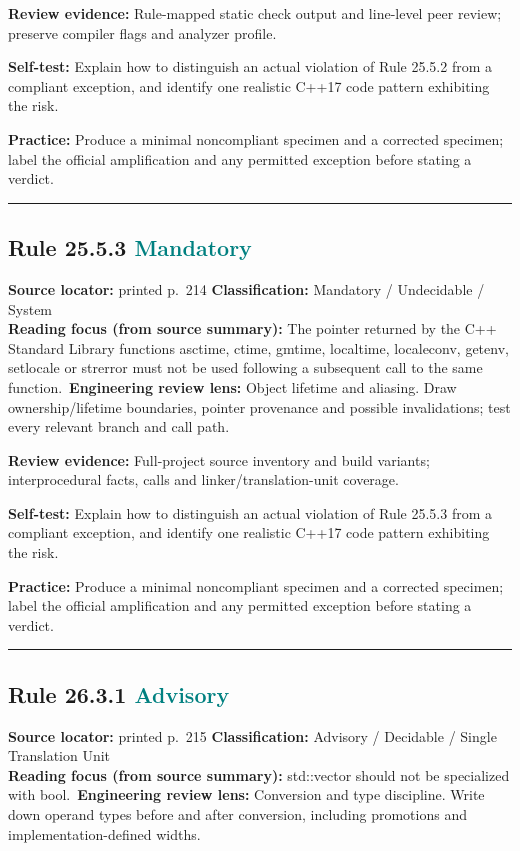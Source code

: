 \documentclass[10pt,letterpaper]{article}
\begin{document}
\textbf{Review evidence:} Rule-mapped static check output and line-level peer review; preserve compiler flags and analyzer profile.

\textbf{Self-test:} Explain how to distinguish an actual violation of Rule 25.5.2 from a compliant exception, and identify one realistic C++17 code pattern exhibiting the risk.\par
\textbf{Practice:} Produce a minimal noncompliant specimen and a corrected specimen; label the official amplification and any permitted exception before stating a verdict.
\smallskip\hrule\smallskip
\subsection*{Rule 25.5.3 \enspace \texorpdfstring{\small\textcolor{teal}{Mandatory}}{Mandatory}}
\noindent\textbf{Source locator:} printed p.~214 \quad\textbf{Classification:} Mandatory / Undecidable / System\\
\textbf{Reading focus (from source summary):} The pointer returned by the C++ Standard Library functions asctime, ctime, gmtime, localtime, localeconv, getenv, setlocale or strerror must not be used following a subsequent call to the same function.\
\textbf{Engineering review lens:} Object lifetime and aliasing. Draw ownership/lifetime boundaries, pointer provenance and possible invalidations; test every relevant branch and call path.

\textbf{Review evidence:} Full-project source inventory and build variants; interprocedural facts, calls and linker/translation-unit coverage.

\textbf{Self-test:} Explain how to distinguish an actual violation of Rule 25.5.3 from a compliant exception, and identify one realistic C++17 code pattern exhibiting the risk.\par
\textbf{Practice:} Produce a minimal noncompliant specimen and a corrected specimen; label the official amplification and any permitted exception before stating a verdict.
\smallskip\hrule\smallskip
\subsection*{Rule 26.3.1 \enspace \texorpdfstring{\small\textcolor{teal}{Advisory}}{Advisory}}
\noindent\textbf{Source locator:} printed p.~215 \quad\textbf{Classification:} Advisory / Decidable / Single Translation Unit\\
\textbf{Reading focus (from source summary):} std::vector should not be specialized with bool.\
\textbf{Engineering review lens:} Conversion and type discipline. Write down operand types before and after conversion, including promotions and implementation-defined widths.
\end{document}

